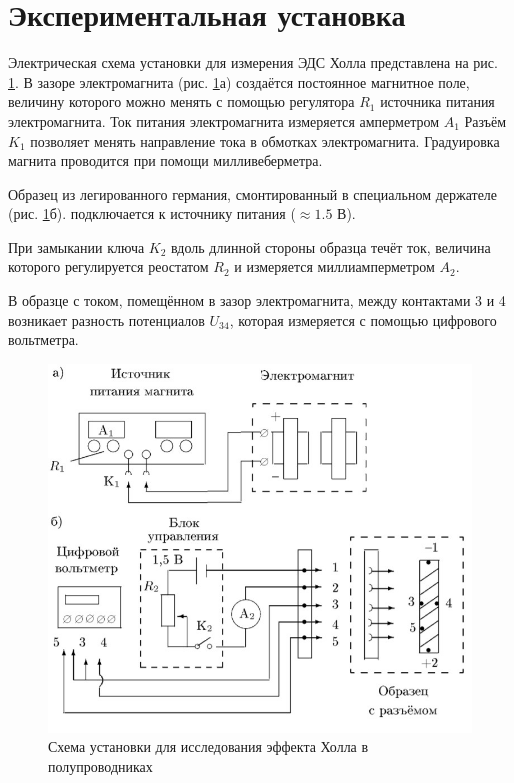 \documentclass[a4paper,12pt]{article} %
\begin{document}
\section{Экспериментальная установка}

Электрическая схема установки для измерения ЭДС Холла представлена на рис. \ref{ust}. В зазоре электромагнита (рис. \ref{ust}а) создаётся постоянное магнитное поле, величину которого можно менять с помощью регулятора $ R_1 $ источника питания электромагнита. Ток питания электромагнита измеряется амперметром $ A_1 $ Разъём $ K_1 $ позволяет менять направление тока в обмотках электромагнита. Градуировка магнита проводится при помощи милливеберметра.

Образец из легированного германия, смонтированный в специальном держателе (рис. \ref{ust}б). подключается к источнику питания ($ \approx 1.5 $ В).

При замыкании ключа $ K_2 $ вдоль длинной стороны образца течёт ток, величина которого регулируется реостатом $ R_2 $ и измеряется миллиамперметром $ A_2 $.


В образце с током, помещённом в зазор электромагнита, между контактами 3 и 4 возникает разность потенциалов $ U_{34} $, которая измеряется с помощью цифрового вольтметра.

\begin{figure}[h]
	\centering
	\includegraphics[width=15cm]{ust.jpg}
	\caption{Схема установки для исследования эффекта Холла	в полупроводниках}
	\label{ust}
\end{figure}
\end{document}
